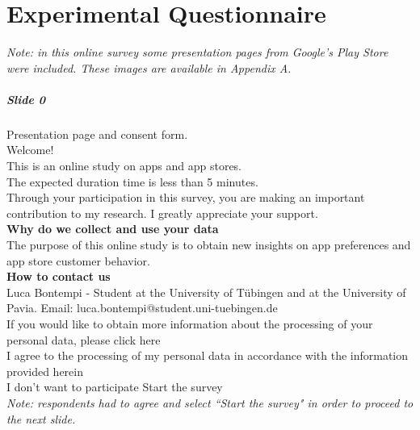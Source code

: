 
\newpage
{}%
\chapter*{\thechapter \quad Experimental Questionnaire}
\label{appendixB}

\emph{Note: in this online survey some presentation pages from Google's Play Store were included. These images are available in Appendix A.}

\paragraph{Slide 0} Presentation page and consent form.\\
Welcome!\\
This is an online study on apps and app stores.\\
The expected duration time is less than 5 minutes.\\
Through your participation in this survey, you are making an important contribution to my research. I greatly appreciate your support.\\
\textbf{Why do we collect and use your data}\\
The purpose of this online study is to obtain new insights on app preferences and app store customer behavior.\\
\textbf{How to contact us}\\
Luca Bontempi - Student at the University of Tübingen and at the University of Pavia.
Email: luca.bontempi@student.uni-tuebingen.de\\
If you would like to obtain more information about the processing of your personal data, please click here\\
{\huge \Square} I agree to the processing of my personal data in accordance with the information provided herein\\
{\huge \Square} I don't want to participate {\huge \Square} Start the survey\\
\emph{Note: respondents had to agree and select ``Start the survey" in order to proceed to the next slide.}

